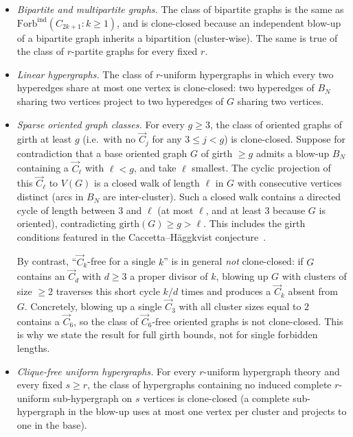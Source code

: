 \documentclass[11pt]{article}
\theoremstyle{definition}
\begin{document}
\begin{itemize}[leftmargin=2em]
\item \emph{Bipartite and multipartite graphs.}  The class of bipartite
graphs is the same as $\mathrm{Forb}^{\mathrm{ind}}(C_{2k+1}:k\ge 1)$,
and is clone-closed because an independent blow-up of a bipartite graph
inherits a bipartition (cluster-wise).  The same is true of the class
of $r$-partite graphs for every fixed $r$.
\item \emph{Linear hypergraphs.}  The class of $r$-uniform hypergraphs
in which every two hyperedges share at most one vertex is clone-closed:
two hyperedges of $B_N$ sharing two vertices project to two hyperedges
of $G$ sharing two vertices.
\item \emph{Sparse oriented graph classes.}  For every $g\ge 3$, the
class of oriented graphs of girth at least $g$ (i.e.\ with no
$\overrightarrow C_j$ for any $3\le j<g$) is clone-closed.  Suppose for
contradiction that a base oriented graph $G$ of girth $\ge g$ admits a
blow-up $B_N$ containing a $\overrightarrow C_\ell$ with $\ell<g$, and
take $\ell$ smallest.  The cyclic projection of this $\overrightarrow
C_\ell$ to $V(G)$ is a closed walk of length $\ell$ in $G$ with
consecutive vertices distinct (arcs in $B_N$ are inter-cluster).  Such a
closed walk contains a directed cycle of length between $3$ and $\ell$
(at most $\ell$, and at least $3$ because $G$ is oriented), contradicting
$\mathrm{girth}(G)\ge g>\ell$.  This includes the girth conditions
featured in the Caccetta--H\"aggkvist
conjecture~\cite[\S5]{Razborov2007}.

\smallskip
By contrast, ``$\overrightarrow C_k$-free for a single $k$'' is in
general \emph{not} clone-closed: if $G$ contains an
$\overrightarrow C_d$ with $d\ge 3$ a proper divisor of $k$, blowing up
$G$ with clusters of size $\ge 2$ traverses this short cycle $k/d$
times and produces a $\overrightarrow C_k$ absent from $G$.  Concretely,
blowing up a single $\overrightarrow C_3$ with all cluster sizes equal
to $2$ contains a $\overrightarrow C_6$, so the class of
$\overrightarrow C_6$-free oriented graphs is not clone-closed.  This is
why we state the result for full girth bounds, not for single
forbidden lengths.
\item \emph{Clique-free uniform hypergraphs.}  For every $r$-uniform
hypergraph theory and every fixed $s\ge r$, the class of hypergraphs
containing no induced complete $r$-uniform sub-hypergraph on $s$
vertices is clone-closed (a complete sub-hypergraph in the blow-up uses
at most one vertex per cluster and projects to one in the base).
\end{itemize}
\end{document}
